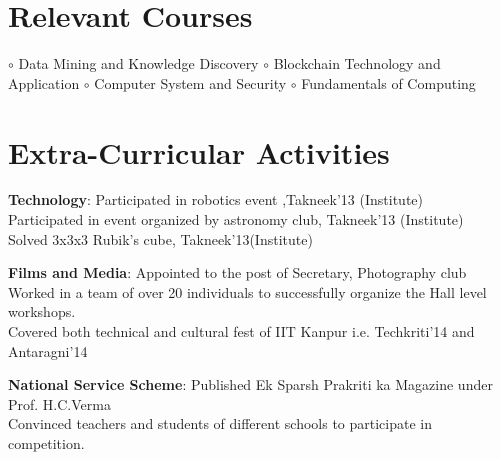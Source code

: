 \documentclass[letterpaper,11pt]{article}
\newcommand{\resumeSubHeadingListStart}{\begin{itemize}[leftmargin=*]}
\newcommand{\resumeSubHeadingListEnd}{\end{itemize}}
\begin{document}
\section{Relevant Courses}
  \small{
    $\circ$ Data Mining and Knowledge Discovery \hfill
    $\circ$ Blockchain Technology and Application \hfill
    $\circ$ Computer System and Security \hspace{15mm}
    $\circ$ Fundamentals of Computing \hspace{25mm}
    }


%
\section{Extra-Curricular Activities}
  \resumeSubHeadingListStart
  \small{
    \item{
      \textbf{Technology}{: Participated in robotics event ,Takneek'13 (Institute)\\ \hspace{2.3cm}Participated in event organized by astronomy club, Takneek'13 (Institute)\\ \hspace{2.3cm}Solved 3x3x3 Rubik’s cube, Takneek’13(Institute)}}
      \vspace{-3mm}
       \item{
      \textbf{Films and Media}{: Appointed to the post of Secretary, Photography club\\ \hspace{3.3cm}Worked in a team of over 20 individuals to successfully organize the Hall level workshops.\\ \hspace{3.3cm}Covered both technical and cultural fest of IIT Kanpur i.e. Techkriti’14 and Antaragni’14}}
         \vspace{-3mm}
       \item{
      \textbf{National Service Scheme}{: Published Ek Sparsh Prakriti ka Magazine under Prof. H.C.Verma\\ \hspace{4.7cm}Convinced teachers and students of different schools to participate in competition.}}}
  \resumeSubHeadingListEnd


\end{document}
